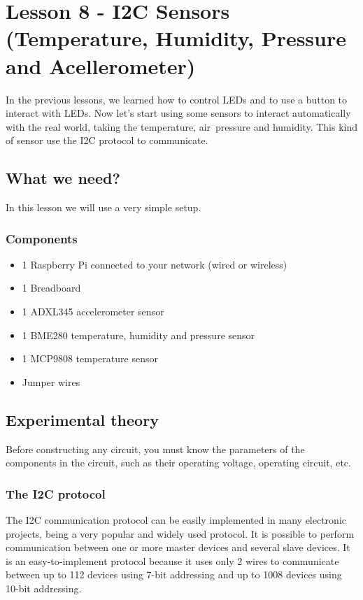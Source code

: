 \documentclass[10pt,twoside,english]{_support/latex/sbabook/sbabook}
\begin{document}
\frontmatter
\pagestyle{plain}

\tableofcontents*
\clearpage\listoffigures

\mainmatter

\chapter{Lesson 8 - I2C Sensors (Temperature, Humidity, Pressure and Acellerometer)}
In the previous lessons, we learned how to control LEDs and to use a button to interact with LEDs. Now let's start using some sensors to interact automatically with the real world, taking the temperature, air pressure and humidity. This kind of sensor use the I2C protocol to communicate.
\section{What we need?}
In this lesson we will use a very simple setup.
\subsection{Components}
\begin{itemize}
\item 1 Raspberry Pi connected to your network (wired or wireless)
\item 1 Breadboard
\item 1 ADXL345 accelerometer sensor
\item 1 BME280 temperature, humidity and pressure sensor
\item 1 MCP9808 temperature sensor
\item Jumper wires
\end{itemize}
\section{Experimental theory}
Before constructing any circuit, you must know the parameters of the components in the circuit, such as their operating voltage, operating circuit, etc.
\subsection{The I2C protocol}
The I2C communication protocol can be easily implemented in many electronic projects, being a very popular and widely used protocol. It is possible to perform communication between one or more master devices and several slave devices. It is an easy-to-implement protocol because it uses only 2 wires to communicate between up to 112 devices using 7-bit addressing and up to 1008 devices using 10-bit addressing.
\end{document}
